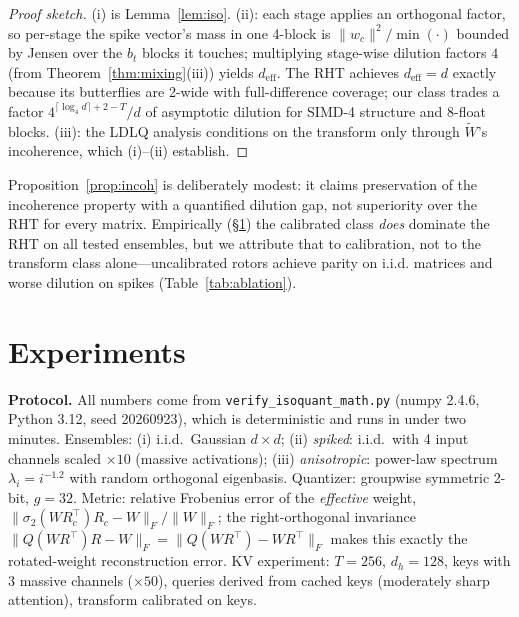 \documentclass{article}
\newcommand{\norm}[1]{\lVert #1 \rVert}
\begin{document}
\begin{proof}[Proof sketch]
(i) is Lemma~\ref{lem:iso}. (ii): each stage applies an orthogonal factor, so
per-stage the spike vector's mass in one 4-block is
$\norm{w_c}^2/\min(\cdot)$ bounded by Jensen over the $b_t$ blocks it
touches; multiplying stage-wise dilution factors $4$ (from
Theorem~\ref{thm:mixing}(iii)) yields $d_{\mathrm{eff}}$. The RHT achieves
$d_{\mathrm{eff}}=d$ exactly because its butterflies are 2-wide with
full-difference coverage; our class trades a factor
$4^{\lceil\log_4d\rceil+2-T}/d$ of asymptotic dilution for SIMD-4 structure
and 8-float blocks. (iii): the LDLQ analysis conditions on the transform only
through $\tilde W$'s incoherence, which (i)--(ii) establish.
\end{proof}

Proposition~\ref{prop:incoh} is deliberately modest: it claims preservation of
the incoherence property with a quantified dilution gap, not superiority over
the RHT for every matrix. Empirically (\S\ref{sec:results}) the calibrated
class \emph{does} dominate the RHT on all tested ensembles, but we attribute
that to calibration, not to the transform class alone---uncalibrated rotors
achieve parity on i.i.d. matrices and worse dilution on spikes
(Table~\ref{tab:ablation}).

\section{Experiments}
\label{sec:results}

\textbf{Protocol.} All numbers come from \texttt{verify\_isoquant\_math.py}
(numpy 2.4.6, Python 3.12, seed 20260923), which is deterministic and runs in
under two minutes. Ensembles: (i) i.i.d.\ Gaussian $d\times d$; (ii)
\emph{spiked}: i.i.d.\ with 4 input channels scaled $\times10$ (massive
activations); (iii) \emph{anisotropic}: power-law spectrum
$\lambda_i=i^{-1.2}$ with random orthogonal eigenbasis. Quantizer:
groupwise symmetric 2-bit, $g=32$. Metric: relative Frobenius error of the
\emph{effective} weight, $\norm{\sigma_2(WR_c^\top)R_c-W}_F/\norm{W}_F$; the
right-orthogonal invariance $\norm{Q(WR^\top)R-W}_F=\norm{Q(WR^\top)-WR^\top}_F$
makes this exactly the rotated-weight reconstruction error. KV experiment:
$T=256$, $d_h=128$, keys with 3 massive channels ($\times50$), queries derived
from cached keys (moderately sharp attention), transform calibrated on keys.
\end{document}
